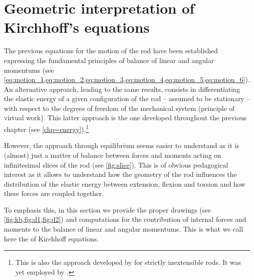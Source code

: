\pagebreak
\section{Geometric interpretation of Kirchhoff's equations}\label{sec=geointerp}



The previous equations for the motion of the rod have been established expressing the fundamental principles of balance of linear and angular momentums (see \cref{eq:motion_1,eq:motion_2,eq:motion_3,eq:motion_4,eq:motion_5,eq:motion_6}). An alternative approach, leading to the same results, consists in differentiating the elastic energy of a given configuration of the rod -- assumed to be stationary -- with respect to the degrees of freedom of the mechanical system (principle of virtual work). This latter approach is the one developed throughout the previous chapter (see \cref{chp=energy}).\footnote{This is also the approach developed by  for strictly inextensible rods. It was yet employed by .}

However, the approach through equilibrium seems easier to understand as it is (almost) just a matter of balance between forces and moments acting on infinitesimal slices of the rod (see \cref{fig:slice}). This is of obvious pedagogical interest as it allows to understand how the geometry of the rod influences the distribution of the elastic energy between extension, flexion and torsion and how these forces are coupled together.

To emphasis this, in this section we provide the proper drawings (see \cref{fig:kb,fig:d1,fig:d2}) and computations for the contribution of internal forces and moments to the balance of linear and angular momentums. This is what we call here the  of Kirchhoff equations.


